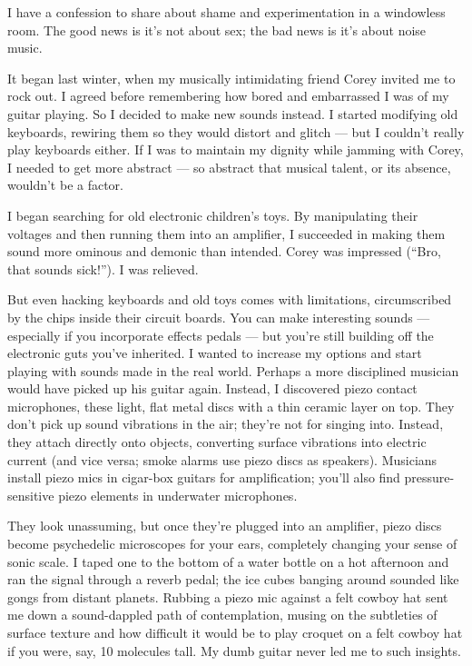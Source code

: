 I have a confession to share about shame and experimentation in a
windowless room. The good news is it's not about sex; the bad news is
it's about noise music.

It began last winter, when my musically intimidating friend Corey
invited me to rock out. I agreed before remembering how bored and
embarrassed I was of my guitar playing. So I decided to make new sounds
instead. I started modifying old keyboards, rewiring them so they would
distort and glitch --- but I couldn't really play keyboards either. If I
was to maintain my dignity while jamming with Corey, I needed to get
more abstract --- so abstract that musical talent, or its absence,
wouldn't be a factor.

I began searching for old electronic children's toys. By manipulating
their voltages and then running them into an amplifier, I succeeded in
making them sound more ominous and demonic than intended. Corey was
impressed (``Bro, that sounds sick!''). I was relieved.

But even hacking keyboards and old toys comes with limitations,
circumscribed by the chips inside their circuit boards. You can make
interesting sounds --- especially if you incorporate effects pedals ---
but you're still building off the electronic guts you've inherited. I
wanted to increase my options and start playing with sounds made in the
real world. Perhaps a more disciplined musician would have picked up his
guitar again. Instead, I discovered piezo contact microphones, these
light, flat metal discs with a thin ceramic layer on top. They don't
pick up sound vibrations in the air; they're not for singing into.
Instead, they attach directly onto objects, converting surface
vibrations into electric current (and vice versa; smoke alarms use piezo
discs as speakers). Musicians install piezo mics in cigar-box guitars
for amplification; you'll also find pressure-sensitive piezo elements in
underwater microphones.

They look unassuming, but once they're plugged into an amplifier, piezo
discs become psychedelic microscopes for your ears, completely changing
your sense of sonic scale. I taped one to the bottom of a water bottle
on a hot afternoon and ran the signal through a reverb pedal; the ice
cubes banging around sounded like gongs from distant planets. Rubbing a
piezo mic against a felt cowboy hat sent me down a sound-dappled path of
contemplation, musing on the subtleties of surface texture and how
difficult it would be to play croquet on a felt cowboy hat if you were,
say, 10 molecules tall. My dumb guitar never led me to such insights.

